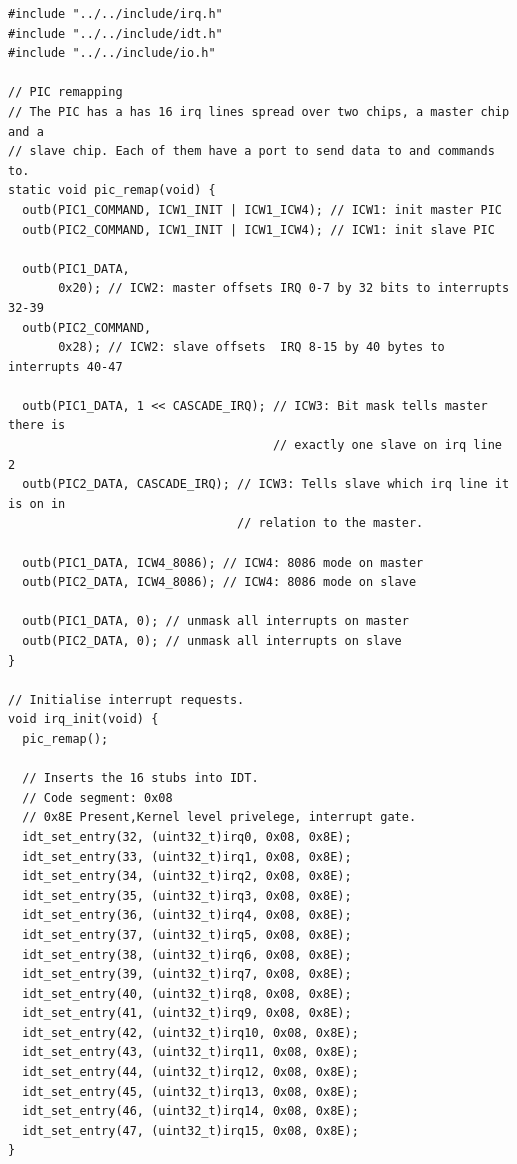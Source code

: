 \documentclass[../main.tex]{subfiles}
\begin{document}
\begin{listing}[H]
    \begin{verbatim}
#include "../../include/irq.h"
#include "../../include/idt.h"
#include "../../include/io.h"

// PIC remapping
// The PIC has a has 16 irq lines spread over two chips, a master chip and a
// slave chip. Each of them have a port to send data to and commands to.
static void pic_remap(void) {
  outb(PIC1_COMMAND, ICW1_INIT | ICW1_ICW4); // ICW1: init master PIC
  outb(PIC2_COMMAND, ICW1_INIT | ICW1_ICW4); // ICW1: init slave PIC

  outb(PIC1_DATA,
       0x20); // ICW2: master offsets IRQ 0-7 by 32 bits to interrupts 32-39
  outb(PIC2_COMMAND,
       0x28); // ICW2: slave offsets  IRQ 8-15 by 40 bytes to interrupts 40-47

  outb(PIC1_DATA, 1 << CASCADE_IRQ); // ICW3: Bit mask tells master there is
                                     // exactly one slave on irq line 2
  outb(PIC2_DATA, CASCADE_IRQ); // ICW3: Tells slave which irq line it is on in
                                // relation to the master.

  outb(PIC1_DATA, ICW4_8086); // ICW4: 8086 mode on master
  outb(PIC2_DATA, ICW4_8086); // ICW4: 8086 mode on slave

  outb(PIC1_DATA, 0); // unmask all interrupts on master
  outb(PIC2_DATA, 0); // unmask all interrupts on slave
}

// Initialise interrupt requests.
void irq_init(void) {
  pic_remap();

  // Inserts the 16 stubs into IDT.
  // Code segment: 0x08
  // 0x8E Present,Kernel level privelege, interrupt gate.
  idt_set_entry(32, (uint32_t)irq0, 0x08, 0x8E);
  idt_set_entry(33, (uint32_t)irq1, 0x08, 0x8E);
  idt_set_entry(34, (uint32_t)irq2, 0x08, 0x8E);
  idt_set_entry(35, (uint32_t)irq3, 0x08, 0x8E);
  idt_set_entry(36, (uint32_t)irq4, 0x08, 0x8E);
  idt_set_entry(37, (uint32_t)irq5, 0x08, 0x8E);
  idt_set_entry(38, (uint32_t)irq6, 0x08, 0x8E);
  idt_set_entry(39, (uint32_t)irq7, 0x08, 0x8E);
  idt_set_entry(40, (uint32_t)irq8, 0x08, 0x8E);
  idt_set_entry(41, (uint32_t)irq9, 0x08, 0x8E);
  idt_set_entry(42, (uint32_t)irq10, 0x08, 0x8E);
  idt_set_entry(43, (uint32_t)irq11, 0x08, 0x8E);
  idt_set_entry(44, (uint32_t)irq12, 0x08, 0x8E);
  idt_set_entry(45, (uint32_t)irq13, 0x08, 0x8E);
  idt_set_entry(46, (uint32_t)irq14, 0x08, 0x8E);
  idt_set_entry(47, (uint32_t)irq15, 0x08, 0x8E);
}


\end{verbatim}
\end{listing}
\end{document}
